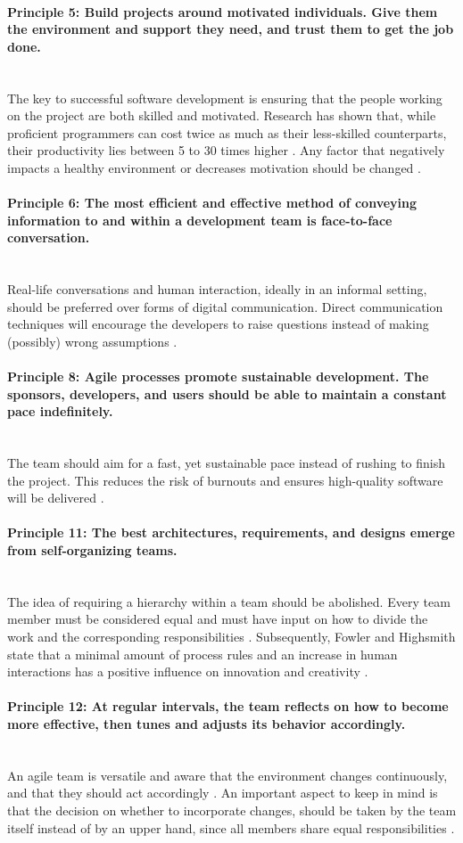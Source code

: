 \newcommand{\agileprinciple}[2]{\paragraph*{Principle #1: #2}\mbox{}\\}


\agileprinciple{5}{Build projects around motivated individuals. Give them the environment and support they need, and trust them to get the job done.}
The key to successful software development is ensuring that the people working on the project are both skilled and motivated. Research has shown that, while proficient programmers can cost twice as much as their less-skilled counterparts, their productivity lies between 5 to 30 times higher \cite{glass2001agile}. Any factor that negatively impacts a healthy environment or decreases motivation should be changed \cite[p.~34]{martin2014}.

\agileprinciple{6}{The most efficient and effective method of conveying information to and within a development team is face-to-face conversation.}
Real-life conversations and human interaction, ideally in an informal setting, should be preferred over forms of digital communication. Direct communication techniques will encourage the developers to raise questions instead of making (possibly) wrong assumptions \cite{fowlerhighsmithagile,glass2001agile}.

\agileprinciple{8}{Agile processes promote sustainable development. The sponsors, developers, and users should be able to maintain a constant pace indefinitely.}
The team should aim for a fast, yet sustainable pace instead of rushing to finish the project. This reduces the risk of burnouts and ensures high-quality software will be delivered \cite{martin2014}.

\agileprinciple{11}{The best architectures, requirements, and designs emerge from self-organizing teams.}
The idea of requiring a hierarchy within a team should be abolished. Every team member must be considered equal and must have input on how to divide the work and the corresponding responsibilities \cite{martin2014}. Subsequently, Fowler and Highsmith state that a minimal amount of process rules and an increase in human interactions has a positive influence on innovation and creativity \cite{fowlerhighsmithagile}. 

\agileprinciple{12}{At regular intervals, the team reflects on how to become more effective, then tunes and adjusts its behavior accordingly.}
An agile team is versatile and aware that the environment changes continuously, and that they should act accordingly \cite{martin2014}. An important aspect to keep in mind is that the decision on whether to incorporate changes, should be taken by the team itself instead of by an upper hand, since all members share equal responsibilities \cite{glass2001agile}.

